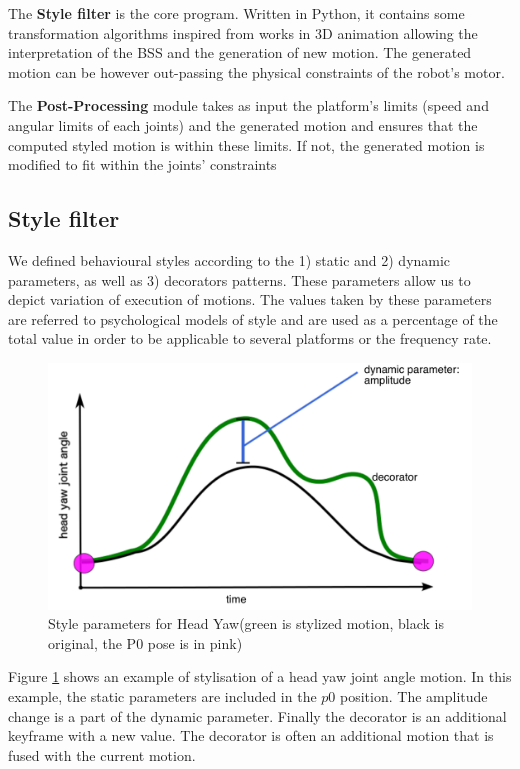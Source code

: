 The \textbf{Style filter} is the core program. 
Written in Python, it contains some transformation algorithms inspired from works in 3D animation allowing the interpretation of the BSS and the generation of new motion.
The generated motion can be however out-passing the physical constraints of the robot's motor. 

The \textbf{Post-Processing} module takes as input the platform's limits (speed and angular limits of each joints) and the generated motion and ensures that the computed styled motion is within these limits.
If not, the generated motion is modified to fit within the joints' constraints


\subsection{Style filter}
\label{ssec:bss}
We defined behavioural styles according to the 1) static and 2) dynamic parameters, as well as 3) decorators patterns. 
These parameters allow us to depict variation of execution of motions.
The values taken by these parameters are referred to psychological models of style and are used as a percentage of the total value in order to be applicable to several platforms or the frequency rate.
\begin{figure}
	\centering
	\includegraphics[width=0.8\linewidth]{Figures/illustrate/style_graph}
	\caption{Style parameters for Head Yaw(green is stylized motion, black is original, the P0 pose is in pink)}
	\label{fig:styles_parameters}
\end{figure}
Figure \ref{fig:styles_parameters} shows an example of stylisation of a head yaw joint angle motion.
In this example, the static parameters are included in the $p0$ position.
The amplitude change is a part of the dynamic parameter. 
Finally the decorator is an additional keyframe with a new value. 
The decorator is often an additional motion that is fused with the current motion.

